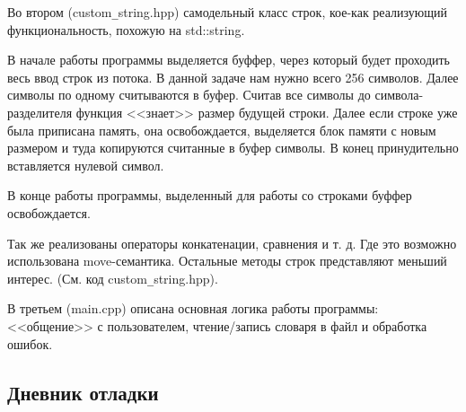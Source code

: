 \documentclass[12pt]{article}
\begin{document}
Во втором (custom\verb|_|string.hpp) самодельный класс строк, кое-как реализующий функциональность, похожую на std::string.

В начале работы программы выделяется буффер, через который будет проходить весь ввод строк из потока.
В данной задаче нам нужно всего 256 символов.
Далее символы по одному считываются в буфер. Считав все символы до символа-разделителя функция <<знает>> размер будущей строки. Далее если строке уже была приписана память, она освобождается, выделяется блок памяти с новым размером и туда копируются считанные в буфер символы. В конец принудительно вставляется нулевой символ.

В конце работы программы, выделенный для работы со строками буффер освобождается.

Так же реализованы операторы конкатенации, сравнения и т. д. Где это возможно использована move-семантика.
Остальные методы строк представляют меньший интерес. (См. код custom\verb|_|string.hpp).

В третьем (main.cpp) описана основная логика работы программы: <<общение>> с пользователем, чтение/запись словаря в файл и обработка ошибок.

\subsection*{Дневник отладки}
\end{document}
